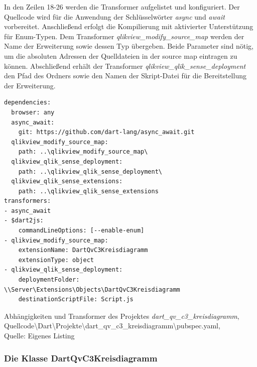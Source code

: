 In den Zeilen 18-26 werden die Transformer aufgelistet und konfiguriert. Der Quellcode wird für die Anwendung der Schlüsselwörter \textit{async} und \textit{await} vorbereitet. Anschließend erfolgt die Kompilierung mit aktivierter Unterstützung für Enum-Typen. Dem Transformer \textit{qlikview\_modify\_source\_map} werden der Name der Erweiterung sowie dessen Typ übergeben. Beide Parameter sind nötig, um die absoluten Adressen der Quelldateien in der source map eintragen zu können. Abschließend erhält der Transformer \textit{qlikview\_qlik\_sense\_deployment} den Pfad des Ordners sowie den Namen der Skript-Datei für die Bereitstellung der Erweiterung.

\ifIncludeFigures\begin{listing}[htbp]
\begin{verbatim}
dependencies:
  browser: any
  async_await:
    git: https://github.com/dart-lang/async_await.git
  qlikview_modify_source_map:
    path: ..\qlikview_modify_source_map\
  qlikview_qlik_sense_deployment:
    path: ..\qlikview_qlik_sense_deployment\
  qlikview_qlik_sense_extensions:
    path: ..\qlikview_qlik_sense_extensions
transformers:
- async_await
- $dart2js:
    commandLineOptions: [--enable-enum]
- qlikview_modify_source_map:
    extensionName: DartQvC3Kreisdiagramm
    extensionType: object
- qlikview_qlik_sense_deployment:
    deploymentFolder: \\Server\Extensions\Objects\DartQvC3Kreisdiagramm
    destinationScriptFile: Script.js
\end{verbatim}
\caption[Abhängigkeiten und Transformer des Projektes \textit{dart\_qv\_c3\_kreisdiagramm}]{Abhängigkeiten und Transformer des Projektes \textit{dart\_qv\_c3\_kreisdiagramm}, \\Quellcode\textbackslash{}Dart\textbackslash{}Projekte\textbackslash{}dart\_qv\_c3\_kreisdiagramm\textbackslash{}pubspec.yaml, \\Quelle: Eigenes Listing}
\label{lst:DartQvC3KreisdiagrammPubspecYaml}
\end{listing}\fi


\subsubsection{Die Klasse DartQvC3Kreisdiagramm}
\label{lab:DieKlasseDartQvC3Kreisdiagramm} 



